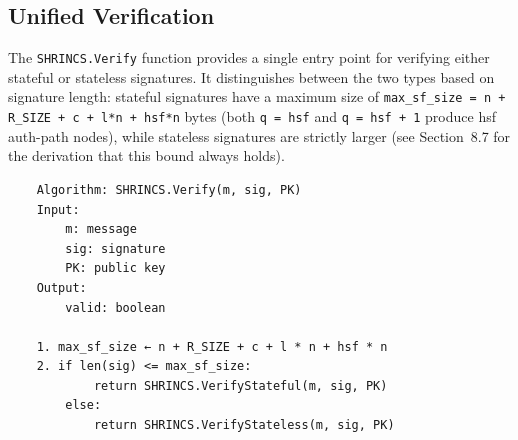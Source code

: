 \subsection{Unified Verification}
The \texttt{SHRINCS.Verify} function provides a single entry point for verifying either stateful or stateless signatures. It distinguishes between the two types based on signature length: stateful signatures have a maximum size of \texttt{max\_sf\_size = n + R\_SIZE + c + l*n + hsf*n} bytes (both \texttt{q = hsf} and \texttt{q = hsf + 1} produce hsf auth-path nodes), while stateless signatures are strictly larger (see Section~8.7 for the derivation that this bound always holds).
\begin{verbatim}
    Algorithm: SHRINCS.Verify(m, sig, PK)
    Input:
        m: message
        sig: signature
        PK: public key
    Output:
        valid: boolean

    1. max_sf_size ← n + R_SIZE + c + l * n + hsf * n
    2. if len(sig) <= max_sf_size:
            return SHRINCS.VerifyStateful(m, sig, PK)
        else:
            return SHRINCS.VerifyStateless(m, sig, PK)
\end{verbatim}